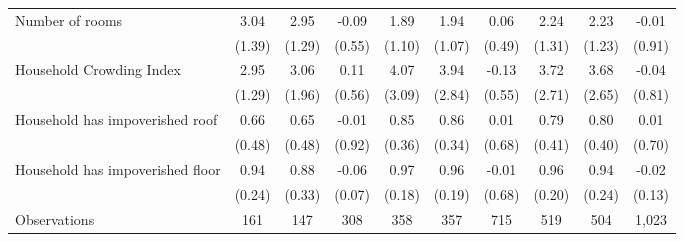 \begin{tabular}{l*{9}c}
Number of rooms&3.04&2.95&-0.09&1.89&1.94&0.06&2.24&2.23&-0.01\\
&(1.39)&(1.29)&(0.55)&(1.10)&(1.07)&(0.49)&(1.31)&(1.23)&(0.91)\\
Household Crowding Index&2.95&3.06&0.11&4.07&3.94&-0.13&3.72&3.68&-0.04\\
&(1.29)&(1.96)&(0.56)&(3.09)&(2.84)&(0.55)&(2.71)&(2.65)&(0.81)\\
Household has impoverished roof&0.66&0.65&-0.01&0.85&0.86&0.01&0.79&0.80&0.01\\
&(0.48)&(0.48)&(0.92)&(0.36)&(0.34)&(0.68)&(0.41)&(0.40)&(0.70)\\
Household has impoverished floor&0.94&0.88&-0.06&0.97&0.96&-0.01&0.96&0.94&-0.02\\
&(0.24)&(0.33)&(0.07)&(0.18)&(0.19)&(0.68)&(0.20)&(0.24)&(0.13)\\
\hline
Observations & 161 & 147 & 308 & 358 & 357 & 715 & 519 & 504 & 1,023 \\
\hline\hline
\end{tabular}
